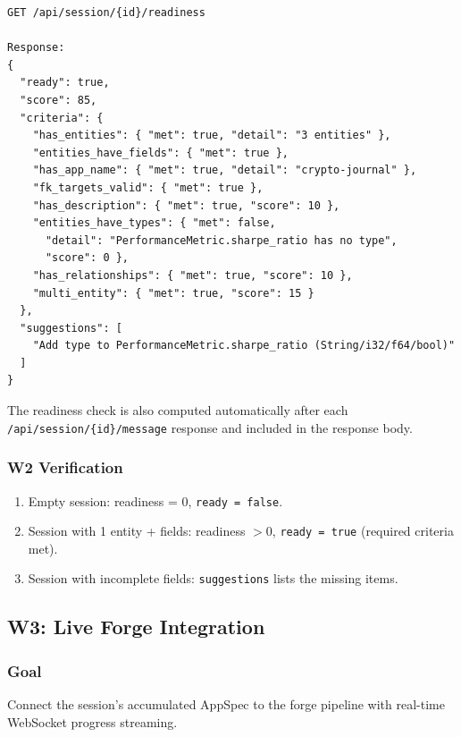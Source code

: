 \documentclass[11pt,a4paper]{article}
\begin{document}
\begin{lstlisting}[style=json]
GET /api/session/{id}/readiness

Response:
{
  "ready": true,
  "score": 85,
  "criteria": {
    "has_entities": { "met": true, "detail": "3 entities" },
    "entities_have_fields": { "met": true },
    "has_app_name": { "met": true, "detail": "crypto-journal" },
    "fk_targets_valid": { "met": true },
    "has_description": { "met": true, "score": 10 },
    "entities_have_types": { "met": false, 
      "detail": "PerformanceMetric.sharpe_ratio has no type",
      "score": 0 },
    "has_relationships": { "met": true, "score": 10 },
    "multi_entity": { "met": true, "score": 15 }
  },
  "suggestions": [
    "Add type to PerformanceMetric.sharpe_ratio (String/i32/f64/bool)"
  ]
}
\end{lstlisting}

The readiness check is also computed automatically after each 
\texttt{/api/session/\{id\}/message} response and included in the 
response body.

\subsubsection{W2 Verification}

\begin{enumerate}[nosep]
\item Empty session: readiness = 0, \texttt{ready = false}.
\item Session with 1 entity + fields: readiness $>$0, 
      \texttt{ready = true} (required criteria met).
\item Session with incomplete fields: \texttt{suggestions} 
      lists the missing items.
\end{enumerate}


\subsection{W3: Live Forge Integration}
\label{sec:w3}

\subsubsection{Goal}

Connect the session's accumulated AppSpec to the forge pipeline 
with real-time WebSocket progress streaming.
\end{document}
